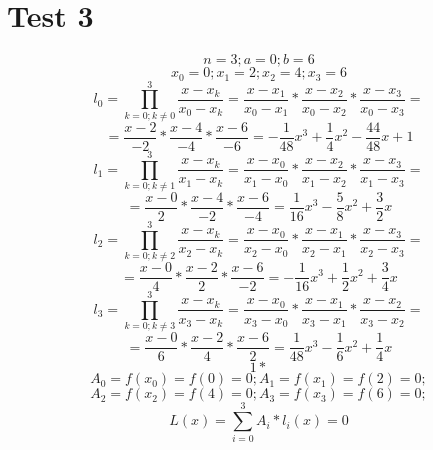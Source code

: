 \documentclass [12pt,fleqn] {article}
\begin{document}
\section*{Test 3}
\[n=3; a=0; b=6\]
\[x_0=0; x_1=2; x_2=4; x_3=6\]
\[l_0=\prod\limits_{k=0;k\neq0}^3\frac{x-x_k}{x_0-x_k}=\frac{x-x_1}{x_0-x_1}*\frac{x-x_2}{x_0-x_2}*\frac{x-x_3}{x_0-x_3}=\]\[=\frac{x-2}{-2}*\frac{x-4}{-4}*\frac{x-6}{-6}=-\frac{1}{48}x^3+\frac{1}{4}x^2-\frac{44}{48}x+1\]
\[l_1=\prod\limits_{k=0;k\neq1}^3\frac{x-x_k}{x_1-x_k}=\frac{x-x_0}{x_1-x_0}*\frac{x-x_2}{x_1-x_2}*\frac{x-x_3}{x_1-x_3}=\]\[=\frac{x-0}{2}*\frac{x-4}{-2}*\frac{x-6}{-4}=\frac{1}{16}x^3-\frac{5}{8}x^2+\frac{3}{2}x\]
\[l_2=\prod\limits_{k=0;k\neq2}^3\frac{x-x_k}{x_2-x_k}=\frac{x-x_0}{x_2-x_0}*\frac{x-x_1}{x_2-x_1}*\frac{x-x_3}{x_2-x_3}=\]\[=\frac{x-0}{4}*\frac{x-2}{2}*\frac{x-6}{-2}=-\frac{1}{16}x^3+\frac{1}{2}x^2+\frac{3}{4}x\]
\[l_3=\prod\limits_{k=0;k\neq3}^3\frac{x-x_k}{x_3-x_k}=\frac{x-x_0}{x_3-x_0}*\frac{x-x_1}{x_3-x_1}*\frac{x-x_2}{x_3-x_2}=\]\[=\frac{x-0}{6}*\frac{x-2}{4}*\frac{x-6}{2}=\frac{1}{48}x^3-\frac{1}{6}x^2+\frac{1}{4}x\]
\[1*\]
\[A_0=f(x_0)=f(0)=0; A_1=f(x_1)=f(2)=0;\] \[ A_2=f(x_2)=f(4)=0; A_3=f(x_3)=f(6)=0;\]
\[L(x)=\sum\limits_{i=0}^3A_i*l_i(x)=0\]
\end{document}

